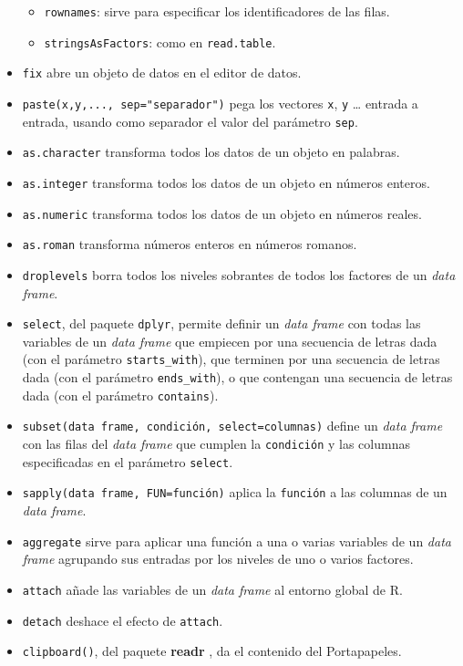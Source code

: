 \documentclass[]{book}
\providecommand{\tightlist}{%
  \setlength{\itemsep}{0pt}\setlength{\parskip}{0pt}}
\theoremstyle{definition}
\theoremstyle{definition}
\theoremstyle{definition}
\theoremstyle{remark}
\begin{document}
\begin{itemize}
  \begin{itemize}
  \tightlist
  \item
    \texttt{rownames}: sirve para especificar los identificadores de las filas.
  \item
    \texttt{stringsAsFactors}: como en \texttt{read.table}.
  \end{itemize}
\item
  \texttt{fix} abre un objeto de datos en el editor de datos.
\item
  \texttt{paste(x,y,...,\ sep="separador")} pega los vectores \texttt{x}, \texttt{y} \ldots{} entrada a entrada, usando como separador el valor del parámetro \texttt{sep}.
\item
  \texttt{as.character} transforma todos los datos de un objeto en palabras.
\item
  \texttt{as.integer} transforma todos los datos de un objeto en números enteros.
\item
  \texttt{as.numeric} transforma todos los datos de un objeto en números reales.
\item
  \texttt{as.roman} transforma números enteros en números romanos.
\item
  \texttt{droplevels} borra todos los niveles sobrantes de todos los factores de un \emph{data frame}.
\item
  \texttt{select}, del paquete \texttt{dplyr}, permite definir un \emph{data frame} con todas las variables de un \emph{data frame} que empiecen por una secuencia de letras dada (con el parámetro \texttt{starts\_with}), que terminen por una secuencia de letras dada (con el parámetro \texttt{ends\_with}), o que contengan una secuencia de letras dada (con el parámetro \texttt{contains}).
\item
  \texttt{subset(data\ frame,\ condición,\ select=columnas)} define un \emph{data frame} con las filas del \emph{data frame} que cumplen la \texttt{condición} y las columnas especificadas en el parámetro \texttt{select}.
\item
  \texttt{sapply(data\ frame,\ FUN=función)} aplica la \texttt{función} a las columnas de un \emph{data frame}.
\item
  \texttt{aggregate} sirve para aplicar una función a una o varias variables de un \emph{data frame} agrupando sus entradas por los niveles de uno o varios factores.
\item
  \texttt{attach} añade las variables de un \emph{data frame} al entorno global de R.
\item
  \texttt{detach} deshace el efecto de \texttt{attach}.
\item
  \texttt{clipboard()}, del paquete \textbf{readr} , da el contenido del Portapapeles.
\end{itemize}
\end{document}
